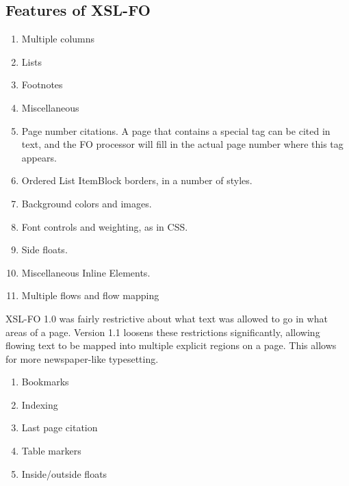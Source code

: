 \subsection{Features of XSL-FO} 
\begin{enumerate}
	\item Multiple columns
    \item Lists
    \item Footnotes
    \item Miscellaneous
    \item Page number citations. A page that contains a special tag can be cited in text, and the FO processor will fill in the actual page number where this tag appears.
    \item Ordered List ItemBlock borders, in a number of styles.
    \item Background colors and images.
    \item Font controls and weighting, as in CSS.
    \item Side floats.
    \item Miscellaneous Inline Elements.
    \item Multiple flows and flow mapping
\end{enumerate}
    

XSL-FO 1.0 was fairly restrictive about what text was allowed to go in what areas of a page. Version 1.1 loosens these restrictions significantly, allowing flowing text to be mapped into multiple explicit regions on a page. This allows for more newspaper-like typesetting.

\begin{enumerate}
    \item Bookmarks
    \item Indexing
    \item Last page citation
    \item Table markers
    \item Inside/outside floats
\end{enumerate}

